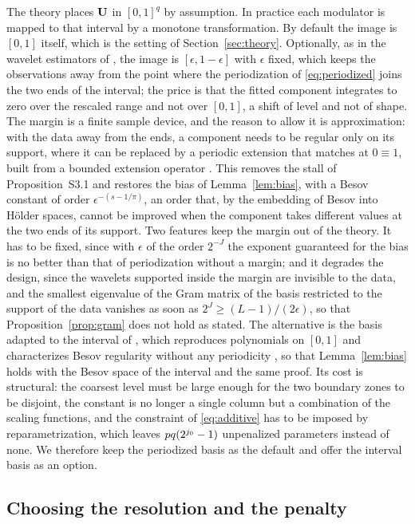 The theory places $\mathbf{U}$ in $[0,1]^q$ by assumption. In practice each modulator
is mapped to that interval by a monotone transformation.
By default the image is $[0,1]$ itself, which is the setting of
Section~\ref{sec:theory}. Optionally, as in the
wavelet estimators of \citet*{Montoril-Chang-Vidakovic-2019}, the image is
$[\epsilon, 1-\epsilon]$ with $\epsilon$ fixed, which keeps the
observations away from the point where the periodization of
\eqref{eq:periodized} joins the two ends of the interval; the price is that the fitted
component integrates to zero over the rescaled range and not over $[0,1]$, a
shift of level and not of shape. The margin is a finite sample
device, and the reason to allow it is approximation: with the data away from
the ends, a component needs to be regular only on its support, where it can be
replaced by a periodic extension that matches at $0 \equiv 1$, built from a
bounded extension operator \citep[Chapter~3]{Triebel-1983}. This removes the
stall of Proposition~S3.1 and restores the bias of Lemma~\ref{lem:bias}, with
a Besov constant of order $\epsilon^{-(s-1/\pi)}$, an order that, by the
embedding of Besov into H\"older spaces, cannot be improved when the component
takes different values at the two ends of its support. Two features keep the
margin out of the theory. It has to be fixed, since with $\epsilon$ of the
order $2^{-J}$ the exponent guaranteed for the bias is no better than that of
periodization without a margin; and it degrades the design, since the
wavelets supported inside the margin are invisible to the data, and the
smallest eigenvalue of the Gram matrix of the basis restricted to the support
of the data vanishes as soon as $2^{J} \ge (L-1)/(2\epsilon)$, so that
Proposition~\ref{prop:gram} does not hold as stated. The alternative is the basis adapted to the
interval of \citet*{cohen1993wavelets}, which reproduces polynomials on $[0,1]$
and characterizes Besov regularity without any periodicity
\citep[Section 3.9]{Cohen-2003}, so that Lemma~\ref{lem:bias} holds with the
Besov space of the interval and the same proof. Its cost is structural: the
coarsest level must be large enough for the two boundary zones to be disjoint,
the constant is no longer a single column but a combination of the scaling
functions, and the constraint of \eqref{eq:additive} has to be imposed by
reparametrization, which leaves $pq(2^{j_{0}}-1)$ unpenalized parameters
instead of none. We therefore keep the periodized basis as the default and
offer the interval basis as an option.

\subsection{Choosing the resolution and the penalty}
\label{sec:tuning}

